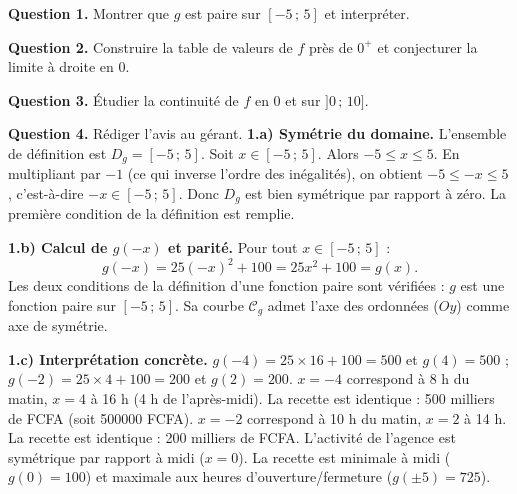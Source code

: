 \documentclass[11pt]{article}
\newcommand{\cle}[1]{{\popxbold\color{popdark}#1}}
\newcommand{\legende}[1]{\par\vspace{6pt}{\popsemi\fontsize{9}{11.5}\selectfont\color{popmuted}#1}}
\begin{document}
\begin{exoresolu}
\textbf{Question 1.} Montrer que $g$ est paire sur $[-5\,;\,5]$ et interpréter.

\textbf{Question 2.} Construire la table de valeurs de $f$ près de $0^+$ et conjecturer la limite à droite en $0$.

\textbf{Question 3.} Étudier la continuité de $f$ en $0$ et sur $]0\,;\,10]$.

\textbf{Question 4.} Rédiger l'avis au gérant.
\tcblower
\textbf{1.a) Symétrie du domaine.} L'ensemble de définition est $D_g = [-5\,;\,5]$. Soit $x \in [-5\,;\,5]$. Alors $-5 \le x \le 5$. En multipliant par $-1$ (ce qui inverse l'ordre des inégalités), on obtient $-5 \le -x \le 5$, c'est-à-dire $-x \in [-5\,;\,5]$. Donc $D_g$ est bien symétrique par rapport à zéro. La première condition de la définition est remplie.

\textbf{1.b) Calcul de $g(-x)$ et parité.} Pour tout $x \in [-5\,;\,5]$ :
\[ g(-x) = 25(-x)^2 + 100 = 25x^2 + 100 = g(x). \]
Les deux conditions de la définition d'une fonction paire sont vérifiées : $g$ est une \cle{fonction paire} sur $[-5\,;\,5]$. Sa courbe $\mathcal{C}_g$ admet l'axe des ordonnées ($Oy$) comme axe de symétrie.

\begin{popfigure}
\legende{Courbe de la fonction $g$ (recette horaire) sur $[-5\,;\,5]$.}
\end{popfigure}

\textbf{1.c) Interprétation concrète.}
$g(-4) = 25 \times 16 + 100 = 500$ et $g(4) = 500$ ; $g(-2) = 25 \times 4 + 100 = 200$ et $g(2) = 200$.
$x = -4$ correspond à 8 h du matin, $x = 4$ à 16 h (4 h de l'après-midi). La recette est identique : \num{500} milliers de FCFA (soit \num{500000} FCFA).
$x = -2$ correspond à 10 h du matin, $x = 2$ à 14 h. La recette est identique : \num{200} milliers de FCFA.
L'activité de l'agence est symétrique par rapport à midi ($x=0$). La recette est minimale à midi ($g(0)=100$) et maximale aux heures d'ouverture/fermeture ($g(\pm 5) = 725$).


\end{exoresolu}
\end{document}
